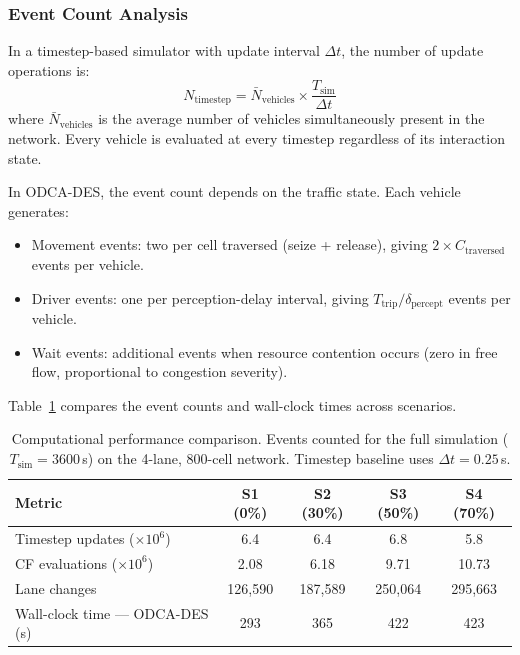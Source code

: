 \documentclass[review,authoryear]{elsarticle}
\begin{document}
\subsubsection{Event Count Analysis}

In a timestep-based simulator with update interval $\Delta t$, the number of update operations is:
\begin{equation}
    N_{\text{timestep}} = \bar{N}_{\text{vehicles}} \times \frac{T_{\text{sim}}}{\Delta t}
    \label{eq:timestep_count}
\end{equation}
where $\bar{N}_{\text{vehicles}}$ is the average number of vehicles simultaneously present in the network. Every vehicle is evaluated at every timestep regardless of its interaction state.

In ODCA-DES, the event count depends on the traffic state. Each vehicle generates:
\begin{itemize}
    \item Movement events: two per cell traversed (seize + release), giving $2 \times C_{\text{traversed}}$ events per vehicle.
    \item Driver events: one per perception-delay interval, giving $T_{\text{trip}} / \delta_{\text{percept}}$ events per vehicle.
    \item Wait events: additional events when resource contention occurs (zero in free flow, proportional to congestion severity).
\end{itemize}

Table~\ref{tab:computational} compares the event counts and wall-clock times across scenarios.

\begin{table}[ht]
\centering
\caption{Computational performance comparison. Events counted for the full simulation ($T_{\text{sim}} = 3600$\,s) on the 4-lane, 800-cell network. Timestep baseline uses $\Delta t = 0.25$\,s.}
\label{tab:computational}
\begin{tabular}{@{}lcccc@{}}
\toprule
Metric & S1 (0\%) & S2 (30\%) & S3 (50\%) & S4 (70\%) \\
\midrule
Timestep updates ($\times 10^6$) & 6.4 & 6.4 & 6.8 & 5.8 \\
CF evaluations ($\times 10^6$) & 2.08 & 6.18 & 9.71 & 10.73 \\
Lane changes & 126{,}590 & 187{,}589 & 250{,}064 & 295{,}663 \\
Wall-clock time --- ODCA-DES (s) & 293 & 365 & 422 & 423 \\
\bottomrule
\end{tabular}
\end{table}
\end{document}

